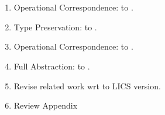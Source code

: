 \section*{}
\begin{enumerate}
	\item	Operational Correspondence: \HOp to \sessp.
	\item	Type Preservation: \HOpp to \HOp.
	\item	Operational Correspondence: \pHOp to \HOp.
	\item	Full Abstraction: \pHOp to \HOp.
	\item	Revise related work wrt to LICS version.
	\item	Review Appendix
\end{enumerate}
